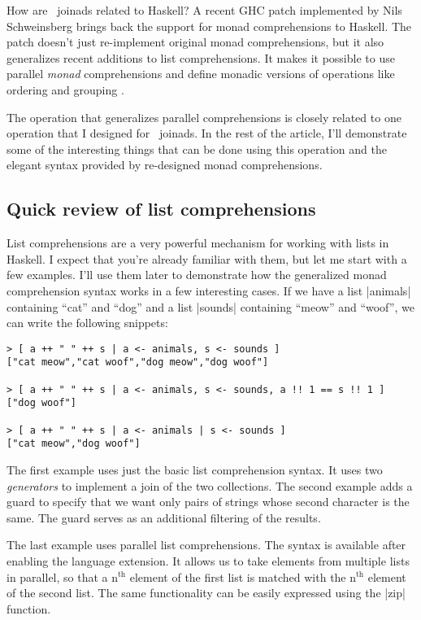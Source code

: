 \documentclass{tmr}
\begin{document}
How are \fsharp \ joinads related to Haskell? A recent GHC patch implemented by Nils Schweinsberg 
\cite{bringbackmc} \cite{comprefun} brings back the support for monad comprehensions to Haskell. 
The patch doesn't just re-implement original monad comprehensions, but it also generalizes recent 
additions to list comprehensions. It makes it possible to use parallel \textit{monad} 
comprehensions and define monadic versions of operations like ordering and grouping 
\cite{groupordercompre}. 

The operation that generalizes parallel comprehensions is closely related to one operation that 
I designed for \fsharp \ joinads. In the rest of the article, I'll demonstrate some of the 
interesting things that can be done using this operation and the elegant syntax provided by 
re-designed monad comprehensions. 


\subsection{Quick review of list comprehensions}
List comprehensions are a very powerful mechanism for working with lists in Haskell. I expect that 
you're already familiar with them, but let me start with a few examples. I'll use them later to 
demonstrate how the generalized monad comprehension syntax works in a few interesting cases.
If we have a list |animals| containing ``cat'' and ``dog'' and a list |sounds| containing 
``meow'' and ``woof'', we can write the following snippets:

\begin{verbatim}
> [ a ++ " " ++ s | a <- animals, s <- sounds ]
["cat meow","cat woof","dog meow","dog woof"]

> [ a ++ " " ++ s | a <- animals, s <- sounds, a !! 1 == s !! 1 ]
["dog woof"]

> [ a ++ " " ++ s | a <- animals | s <- sounds ]
["cat meow","dog woof"]
\end{verbatim}
The first example uses just the basic list comprehension syntax. It uses two \textit{generators}
to implement a join of the two collections. The second example adds a guard to specify that we
want only pairs of strings whose second character is the same. The guard serves as an additional
filtering of the results.

The last example uses parallel list comprehensions. The syntax is available after enabling the 
 language extension. It allows us to take elements from
multiple lists in parallel, so that a n$^\text{th}$ element of the first list is matched with the 
n$^\text{th}$ element of the second list. The same functionality can be easily expressed using the 
|zip| function. 
\end{document}
